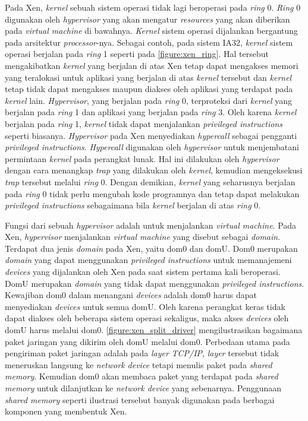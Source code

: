 Pada Xen, \textit{kernel} sebuah sistem operasi tidak lagi beroperasi pada \textit{ring} 0.
\textit{Ring} 0 digunakan oleh \textit{hypervisor} yang akan mengatur \textit{resources} yang
akan diberikan pada \textit{virtual machine} di bawahnya.  \textit{Kernel} sistem operasi
dijalankan bergantung pada arsitektur \textit{processor}-nya.  Sebagai contoh, pada sistem IA32,
\textit{kernel} sistem operasi berjalan pada \textit{ring} 1 seperti pada
\autoref{figure:xen_ring}.  Hal tersebut mengakibatkan \textit{kernel} yang berjalan di atas Xen
tetap dapat mengakses memori yang teralokasi untuk aplikasi yang berjalan di atas
\textit{kernel} tersebut dan \textit{kernel} tetap tidak dapat mengakses maupun diakses oleh
aplikasi yang terdapat pada \textit{kernel} lain.  \textit{Hypervisor}, yang berjalan pada
\textit{ring} 0, terproteksi dari \textit{kernel} yang berjalan pada \textit{ring} 1 dan
aplikasi yang berjalan pada \textit{ring} 3.  Oleh karena \textit{kernel} berjalan pada \textit{ring}
1, \textit{kernel} tidak dapat menjalankan \textit{privileged instructions} seperti biasanya.
\textit{Hypervisor} pada Xen menyediakan \textit{hypercall} sebagai pengganti \textit{privileged
instructions}.  \textit{Hypercall} digunakan oleh \textit{hypervisor} untuk menjembatani
permintaan \textit{kernel} pada perangkat lunak. Hal ini dilakukan oleh \textit{hypervisor}
dengan cara menangkap \textit{trap} yang dilakukan oleh \textit{kernel}, kemudian mengeksekusi
\textit{trap} tersebut melalui \textit{ring} 0. Dengan demikian, \textit{kernel} yang seharusnya
berjalan pada \textit{ring} 0 tidak perlu mengubah kode programnya dan tetap dapat melakukan
\textit{privileged instructions} sebagaimana bila \textit{kernel} berjalan di atas \textit{ring}
0.

Fungsi dari sebuah \textit{hypervisor} adalah untuk menjalankan \textit{virtual machine}.  Pada
Xen, \textit{hypervisor} menjalankan \textit{virtual machine} yang disebut sebagai
\textit{domain}.  Terdapat dua jenis \textit{domain} pada Xen, yaitu dom0 dan domU.  Dom0
merupakan \textit{domain} yang dapat menggunakan \textit{privileged instructions} untuk
memanajemeni \textit{devices} yang dijalankan oleh Xen pada saat sistem pertama kali beroperasi.
DomU merupakan \textit{domain} yang tidak dapat menggunakan \textit{privileged instructions}.
Kewajiban dom0 dalam menangani \textit{devices} adalah dom0 harus dapat menyediakan
\textit{devices} untuk semua domU.  Oleh karena perangkat keras tidak dapat diakses oleh
beberapa sistem operasi sekaligus, maka akses \textit{devices} oleh domU harus melalui dom0.
\autoref{figure:xen_split_driver} mengilustrasikan bagaimana paket jaringan yang dikirim oleh
domU melalui dom0.  Perbedaan utama pada pengiriman paket jaringan adalah pada \textit{layer}
\textit{TCP/IP}, \textit{layer} tersebut tidak meneruskan langsung ke \textit{network device}
tetapi menulis paket pada \textit{shared memory}.  Kemudian dom0 akan membaca paket yang
terdapat pada \textit{shared memory} untuk dilanjutkan ke \textit{network device} yang
sebenarnya.  Penggunaan \textit{shared memory} seperti ilustrasi tersebut banyak digunakan pada
berbagai komponen yang membentuk Xen.

